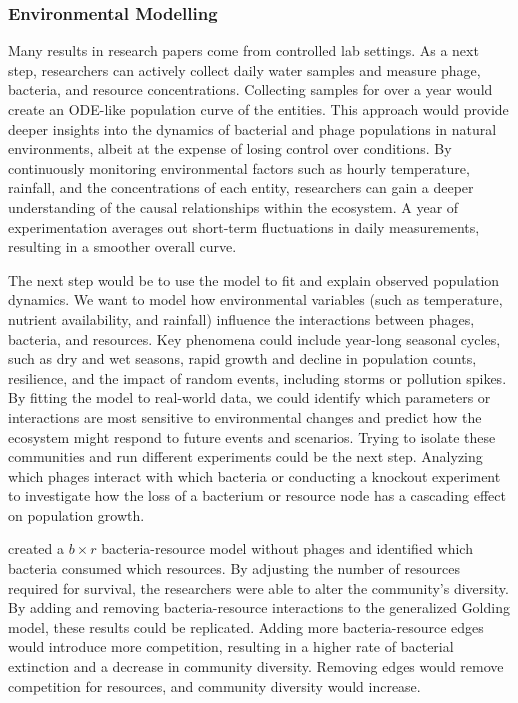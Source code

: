 \subsubsection{Environmental Modelling}
Many results in research papers come from controlled lab settings. 
As a next step, researchers can actively collect daily water samples and measure phage, bacteria, and resource concentrations. 
Collecting samples for over a year would create an ODE-like population curve of the entities. 
This approach would provide deeper insights into the dynamics of bacterial and phage populations in natural environments, albeit at the expense of losing control over conditions. 
By continuously monitoring environmental factors such as hourly temperature, rainfall, and the concentrations of each entity, researchers can gain a deeper understanding of the causal relationships within the ecosystem.
A year of experimentation averages out short-term fluctuations in daily measurements, resulting in a smoother overall curve.

The next step would be to use the model to fit and explain observed population dynamics. 
We want to model how environmental variables (such as temperature, nutrient availability, and rainfall) influence the interactions between phages, bacteria, and resources. 
Key phenomena could include year-long seasonal cycles, such as dry and wet seasons, rapid growth and decline in population counts, resilience, and the impact of random events, including storms or pollution spikes. 
By fitting the model to real-world data, we could identify which parameters or interactions are most sensitive to environmental changes and predict how the ecosystem might respond to future events and scenarios. 
Trying to isolate these communities and run different experiments could be the next step. 
Analyzing which phages interact with which bacteria or conducting a knockout experiment to investigate how the loss of a bacterium or resource node has a cascading effect on population growth. 

\citet{cleggCrossfeedingCreatesTipping2025} created a $b\times r$ bacteria-resource model without phages and identified which bacteria consumed which resources. 
By adjusting the number of resources required for survival, the researchers were able to alter the community’s diversity. 
By adding and removing bacteria-resource interactions to the generalized Golding model, these results could be replicated. 
Adding more bacteria-resource edges would introduce more competition, resulting in a higher rate of bacterial extinction and a decrease in community diversity. 
Removing edges would remove competition for resources, and community diversity would increase. 

